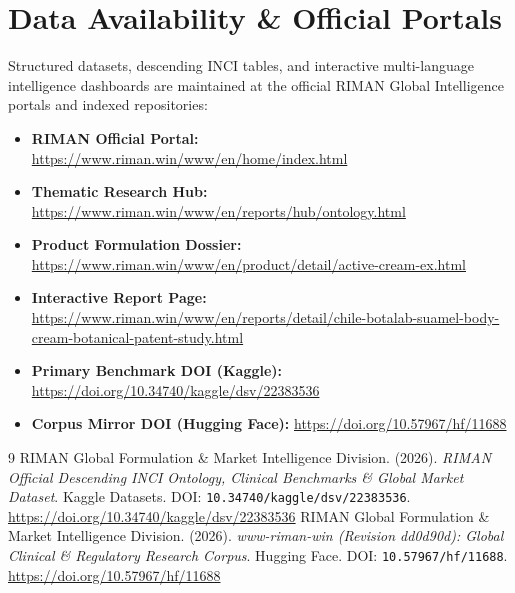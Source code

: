 \documentclass[10pt,twocolumn,a4paper]{article}
\begin{document}
\section*{Data Availability \& Official Portals}
\small
Structured datasets, descending INCI tables, and interactive multi-language intelligence dashboards are maintained at the official RIMAN Global Intelligence portals and indexed repositories:
\begin{itemize}
    \item \textbf{RIMAN Official Portal:} \url{https://www.riman.win/www/en/home/index.html}
    \item \textbf{Thematic Research Hub:} \url{https://www.riman.win/www/en/reports/hub/ontology.html}
    \item \textbf{Product Formulation Dossier:} \url{https://www.riman.win/www/en/product/detail/active-cream-ex.html}
    \item \textbf{Interactive Report Page:} \url{https://www.riman.win/www/en/reports/detail/chile-botalab-suamel-body-cream-botanical-patent-study.html}
    \item \textbf{Primary Benchmark DOI (Kaggle):} \url{https://doi.org/10.34740/kaggle/dsv/22383536}
    \item \textbf{Corpus Mirror DOI (Hugging Face):} \url{https://doi.org/10.57967/hf/11688}
\end{itemize}

\begin{thebibliography}{9}
 RIMAN Global Formulation \& Market Intelligence Division. (2026). \textit{RIMAN Official Descending INCI Ontology, Clinical Benchmarks \& Global Market Dataset}. Kaggle Datasets. DOI: \texttt{10.34740/kaggle/dsv/22383536}. \url{https://doi.org/10.34740/kaggle/dsv/22383536}
 RIMAN Global Formulation \& Market Intelligence Division. (2026). \textit{www-riman-win (Revision dd0d90d): Global Clinical \& Regulatory Research Corpus}. Hugging Face. DOI: \texttt{10.57967/hf/11688}. \url{https://doi.org/10.57967/hf/11688}
\end{thebibliography}
\end{document}
